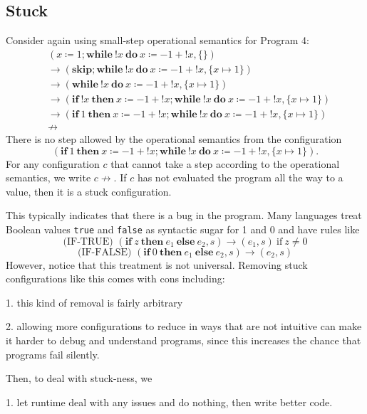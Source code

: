 \subsection{Stuck}
Consider again using small-step operational semantics for Program 4:
\[
\begin{aligned}
&(x \coloneqq 1; \mathbf{while}\ !x\ \mathbf{do}\ x \coloneqq -1 + !x, \{\}) \\
&\to (\mathbf{skip}; \mathbf{while}\ !x\ \mathbf{do}\ x \coloneqq -1 + !x, \{x \mapsto 1\}) \\
&\to (\mathbf{while}\ !x\ \mathbf{do}\ x \coloneqq -1 + !x, \{x \mapsto 1\}) \\
&\to (\mathbf{if}\ !x\ \mathbf{then}\ x \coloneqq -1 + !x; \mathbf{while}\ !x\ \mathbf{do}\ x \coloneqq -1 + !x, \{x \mapsto 1\}) \\
&\to (\mathbf{if}\ 1\ \mathbf{then}\ x \coloneqq -1 + !x; \mathbf{while}\ !x\ \mathbf{do}\ x \coloneqq -1 + !x, \{x \mapsto 1\}) \\
&\not\to
\end{aligned}
\]
There is no step allowed by the operational semantics from the configuration 
\[
  (\mathbf{if}\ 1\ \mathbf{then}\ x \coloneqq -1 + !x; \mathbf{while}\ !x\ \mathbf{do}\ x \coloneqq -1 + !x, \{x \mapsto 1\}).
\]
For any configuration \(c\) that cannot take a step according to the operational semantics, we write \(c \not\to\). If \(c\) has not evaluated the program all the way to a value, then it is a stuck configuration. 

This typically indicates that there is a bug in the program. Many languages treat Boolean values \texttt{true} and \texttt{false} as syntactic sugar for 1 and 0 and have rules like 
\[
  \text{(IF-TRUE) } (\mathbf{if}\ z\ \mathbf{then}\ e_1\ \mathbf{else}\ e_2, s) \to (e_1, s)\ \text{if}\ z \neq 0
\]
\[
  \text{(IF-FALSE) } (\mathbf{if}\ 0\ \mathbf{then}\ e_1\ \mathbf{else}\ e_2, s) \to (e_2, s)
\]
However, notice that this treatment is not universal. Removing stuck configurations like this comes with cons including:

1. this kind of removal is fairly arbitrary

2. allowing more configurations to reduce in ways that are not intuitive can make it harder to debug and understand programs, since this increases the chance that programs fail silently. 

Then, to deal with stuck-ness, we 

1. let runtime deal with any issues and do nothing, then write better code. 

